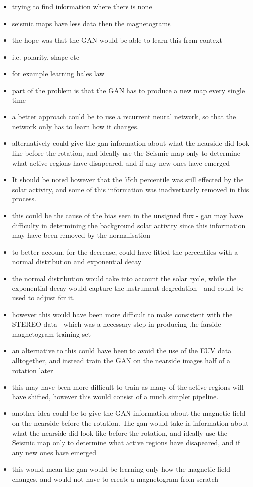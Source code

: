 \documentclass[11pt,a4paper,onecolumn]{report}
\begin{document}
\begin{itemize}
  \item trying to find information where there is none
  \item seismic maps have less data then the magnetograms
  \item the hope was that the GAN would be able to learn this from context
  \item i.e. polarity, shape etc 
  \item for example learning hales law
  \item part of the problem is that the GAN has to produce a new map every
  single time
  \item a better approach could be to use a recurrent neural network, so that
  the network only has to learn how it changes.
  \item alternatively could give the gan information about what the nearside did look
  like before the rotation, and ideally use the Seismic map only to determine
  what active regions have disapeared, and if any new ones have emerged
  


  \item It should be noted however that the 75th percentile was still effected
  by the solar activity, and some of this information was inadvertantly removed in this
  process.
  \item this could be the cause of the bias seen in the unsigned flux - gan may
  have difficulty in determining the background solar activity since this
  information may have been removed by the normalisation
  \item to better account for the decrease, could have fitted the percentiles
  with a normal distribution and exponential decay
  \item the normal distribution would take into account the solar cycle, while
  the exponential decay would capture the instrument degredation - and could be
  used to adjust for it.
  \item however this would have been more difficult to make consistent with the
  STEREO data - which was a necessary step in producing the farside magnetogram
  training set
  \item an alternative to this could have been to avoid the use of the EUV data
  alltogether, and instead train the GAN on the nearside images half of a
  rotation later
  \item this may have been more difficult to train as many of the active regions
  will have shifted, however this would consist of a much simpler pipeline.
  \item another idea could be to give the GAN information about the magnetic
  field on the nearside before the rotation. The gan would take in information
  about what the nearside did look like before the rotation, and ideally use the
  Seismic map only to determine what active regions have disapeared, and if any
  new ones have emerged
  \item this would mean the gan would be learning only how the magnetic field
  changes, and would not have to create a magnetogram from scratch

  

\end{itemize}
\end{document}
